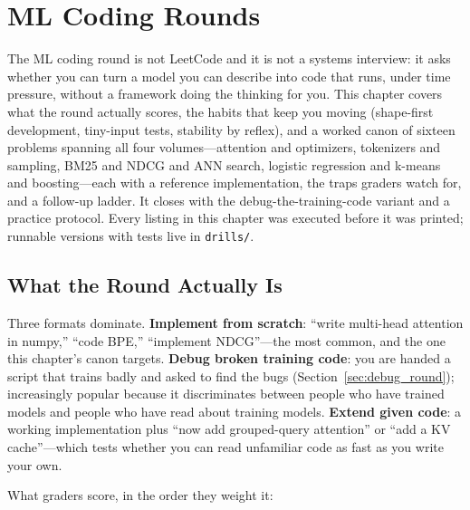 \chapter{ML Coding Rounds}
\label{chap:ml_coding_rounds}

\begin{tldr}
The ML coding round is not LeetCode and it is not a systems interview: it asks whether you can turn a model you can describe into code that runs, under time pressure, without a framework doing the thinking for you. This chapter covers what the round actually scores, the habits that keep you moving (shape-first development, tiny-input tests, stability by reflex), and a worked canon of sixteen problems spanning all four volumes---attention and optimizers, tokenizers and sampling, BM25 and NDCG and ANN search, logistic regression and k-means and boosting---each with a reference implementation, the traps graders watch for, and a follow-up ladder. It closes with the debug-the-training-code variant and a practice protocol. Every listing in this chapter was executed before it was printed; runnable versions with tests live in \texttt{drills/}.
\end{tldr}

\section{What the Round Actually Is}
\label{sec:coding_round_shape}

Three formats dominate. \textbf{Implement from scratch}: ``write multi-head attention in numpy,'' ``code BPE,'' ``implement NDCG''---the most common, and the one this chapter's canon targets. \textbf{Debug broken training code}: you are handed a script that trains badly and asked to find the bugs (Section~\ref{sec:debug_round}); increasingly popular because it discriminates between people who have trained models and people who have read about training models. \textbf{Extend given code}: a working implementation plus ``now add grouped-query attention'' or ``add a KV cache''---which tests whether you can read unfamiliar code as fast as you write your own.

What graders score, in the order they weight it:

